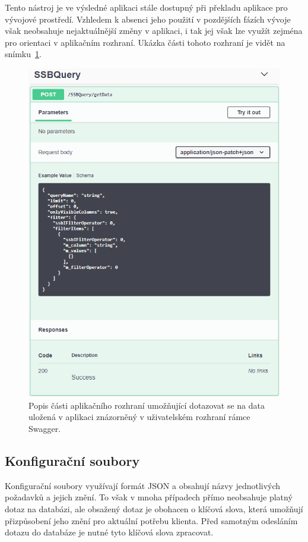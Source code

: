 Tento nástroj je ve výsledné aplikaci stále dostupný při překladu aplikace pro vývojové prostředí. Vzhledem k absenci jeho použití v pozdějších fázích vývoje však neobsahuje nejaktuálnější změny v aplikaci, i tak jej však lze využít zejména pro orientaci v aplikačním rozhraní. Ukázka části tohoto rozhraní je vidět na snímku~\ref{img:swagger}.

\begin{figure}[H]
	\centering
	\label{img:swagger}
	\includegraphics[width=\textwidth]{obrazky-figures/swagger.png}
	\caption{Popis části aplikačního rozhraní umožňující dotazovat se na data uložená v aplikaci znázorněný v uživatelském rozhraní rámce Swagger.}
\end{figure}

\subsection{Konfigurační soubory}
Konfigurační soubory využívají formát JSON a obsahují názvy jednotlivých požadavků a jejich znění. To však v mnoha případech přímo neobsahuje platný dotaz na databázi, ale obsažený dotaz je obohacen o klíčová slova, která umožňují přizpůsobení jeho znění pro aktuální potřebu klienta. Před samotným odesláním dotazu do databáze je nutné tyto klíčová slova zpracovat.


